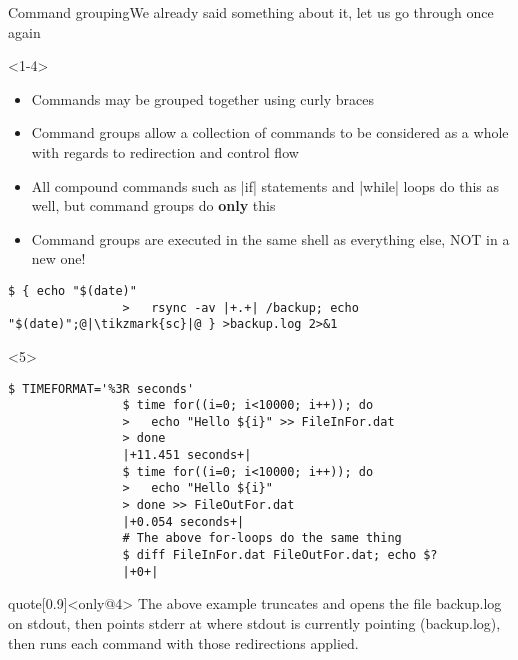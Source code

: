 \begin{frame}[fragile]{Command grouping}{We already said something about it, let us go through once again}
    \vspace{-1mm}
    \begin{overlayarea}{\textwidth}{0.5\textheight}
        \begin{onlyenv}<1-4>
            \begin{itemize}
                \item Commands may be grouped together using curly braces \PB{\texttt{\{\ldots\}}}
                \item Command groups allow a collection of commands to be considered as a whole with regards to redirection and control flow
                \item All compound commands such as \bash|if| statements and \bash|while| loops do this as well, but command groups do \textbf{only} this
                \item Command groups are executed in the same shell as everything else, NOT in a new one!
            \end{itemize}
            \begin{lstlisting}[style=MyBash, numbers=none, aboveskip=2mm]
                $ { echo "$(date)"
                >   rsync -av |+.+| /backup; echo "$(date)";@|\tikzmark{sc}|@ } >backup.log 2>&1
            \end{lstlisting}
        \end{onlyenv}
        \begin{onlyenv}<5>
            \begin{lstlisting}[style=myBash, aboveskip=3mm]
                $ TIMEFORMAT='%3R seconds'
                $ time for((i=0; i<10000; i++)); do
                >   echo "Hello ${i}" >> FileInFor.dat
                > done
                |+11.451 seconds+|
                $ time for((i=0; i<10000; i++)); do
                >   echo "Hello ${i}"
                > done >> FileOutFor.dat
                |+0.054 seconds+|
                # The above for-loops do the same thing
                $ diff FileInFor.dat FileOutFor.dat; echo $?
                |+0+|
            \end{lstlisting}
        \end{onlyenv}
    \end{overlayarea}
    \vspace{-1mm}
    \begin{varblock}{quote}[0.9\textwidth]{}<only@4>
        The above example truncates and opens the file backup.log on stdout, then points stderr at where stdout is currently pointing (backup.log), then runs each command with those redirections applied.

\end{varblock}
\end{frame}

